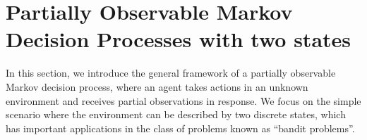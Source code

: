 \documentclass[aps,nofootinbib,groupaddress,superscriptaddress,reprint,amsmath,amssymb,graphicx,onecolumn,prx]{revtex4-2}
\begin{document}
    


\section{Partially Observable Markov Decision Processes with two states}
\noindent In this section, we introduce the general framework of a partially observable Markov decision process, where an agent takes actions in an unknown environment and receives partial observations in response. We focus on the simple scenario where the environment can be described by two discrete states, which has important applications in the class of problems known as ``bandit problems''.
\end{document}
